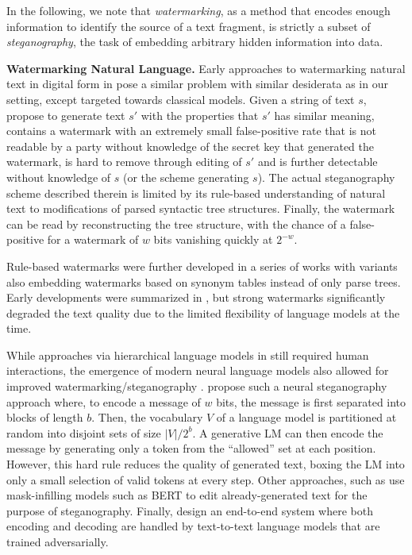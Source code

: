 \documentclass{article}
\theoremstyle{plain}
\theoremstyle{definition}
\theoremstyle{remark}
\begin{document}
In the following, we note that \textit{watermarking}, as a method that encodes enough information to identify the source of a text fragment, is strictly a subset of \textit{steganography}, the task of embedding arbitrary hidden information into data.

\textbf{Watermarking Natural Language.}
 Early approaches to watermarking natural text in digital form in \citet{atallah_natural_2001,atallah_natural_2003} pose a similar problem with similar desiderata as in our setting, except targeted towards classical models. Given a string of text $s$, \citet{atallah_natural_2001} propose to generate text $s'$ with the properties that $s'$ has similar meaning, contains a watermark with an extremely small false-positive rate that is not readable by a party without knowledge of the secret key that generated the watermark, is hard to remove through editing of $s'$ and is further detectable without knowledge of $s$ (or the scheme generating $s$). The actual steganography scheme described therein is limited by its rule-based understanding of natural text to modifications of parsed syntactic tree structures. Finally, the watermark can be read by reconstructing the tree structure, with the chance of a false-positive for a watermark of $w$ bits vanishing quickly at $2^{-w}$.

Rule-based watermarks were further developed in a series of works \citep{chiang_natural_2004,topkara_natural_2006,topkara_hiding_2006,meral_natural_2009,venugopal_watermarking_2011} with variants also embedding watermarks based on synonym tables instead of only parse trees. Early developments were summarized in \citet{jalil_review_2009}, but strong watermarks significantly degraded the text quality due to the limited flexibility of language models at the time.

While approaches via hierarchical language models in \citet{wilson_linguistic_2014} still required human interactions, the emergence of modern neural language models \citep{vaswani_attention_2017,devlin_bert_2019} also allowed for improved watermarking/steganography \citep{fang_generating_2017,ziegler_neural_2019,dai_towards_2019,he_protecting_2022-1,he_cater_2022}. \citet{fang_generating_2017} propose such a neural steganography approach where, to encode a message of $w$ bits, the message is first separated into blocks of length $b$. Then,  the vocabulary $V$ of a language model is partitioned at random into disjoint sets of size $|V|/ 2^b$. A generative LM can then encode the message by generating only a token from the ``allowed'' set at each position. However, this hard rule reduces the quality of generated text, boxing the LM into only a small selection of valid tokens at every step. Other approaches, such as \citet{ueoka_frustratingly_2021} use mask-infilling models such as BERT to edit already-generated text for the purpose of steganography. Finally, \citet{abdelnabi_adversarial_2021} design an end-to-end system where both encoding and decoding are handled by text-to-text language models that are trained adversarially.%
\end{document}

